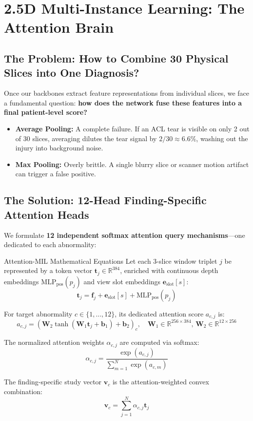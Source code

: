 \documentclass[11pt,a4paper]{article}
\begin{document}
\section{2.5D Multi-Instance Learning: The Attention Brain}

\subsection{The Problem: How to Combine 30 Physical Slices into One Diagnosis?}
Once our backbones extract feature representations from individual slices, we face a fundamental question: \textbf{how does the network fuse these features into a final patient-level score?}
\begin{itemize}[leftmargin=*]
    \item \textbf{Average Pooling:} A complete failure. If an ACL tear is visible on only 2 out of 30 slices, averaging dilutes the tear signal by $2/30 \approx 6.6\%$, washing out the injury into background noise.
    \item \textbf{Max Pooling:} Overly brittle. A single blurry slice or scanner motion artifact can trigger a false positive.
\end{itemize}

\subsection{The Solution: 12-Head Finding-Specific Attention Heads}
We formulate \textbf{12 independent softmax attention query mechanisms}---one dedicated to each abnormality:

\begin{mechbox}{Attention-MIL Mathematical Equations}
Let each 3-slice window triplet $j$ be represented by a token vector $\mathbf{t}_j \in \mathbb{R}^{384}$, enriched with continuous depth embeddings $\text{MLP}_{\text{pos}}(p_j)$ and view slot embeddings $\mathbf{e}_{\text{slot}}[s]$:
$$\mathbf{t}_j = \mathbf{f}_j + \mathbf{e}_{\text{slot}}[s] + \text{MLP}_{\text{pos}}(p_j)$$

For target abnormality $c \in \{1, \ldots, 12\}$, its dedicated attention score $a_{c,j}$ is:
$$a_{c,j} = \left(\mathbf{W}_2 \tanh(\mathbf{W}_1 \mathbf{t}_j + \mathbf{b}_1) + \mathbf{b}_2\right)_c, \quad \mathbf{W}_1 \in \mathbb{R}^{256 \times 384}, \, \mathbf{W}_2 \in \mathbb{R}^{12 \times 256}$$

The normalized attention weights $\alpha_{c,j}$ are computed via softmax:
$$\alpha_{c,j} = \frac{\exp(a_{c,j})}{\sum_{m=1}^N \exp(a_{c,m})}$$

The finding-specific study vector $\mathbf{v}_c$ is the attention-weighted convex combination:
$$\mathbf{v}_c = \sum_{j=1}^N \alpha_{c,j} \mathbf{t}_j$$
\end{mechbox}
\end{document}
